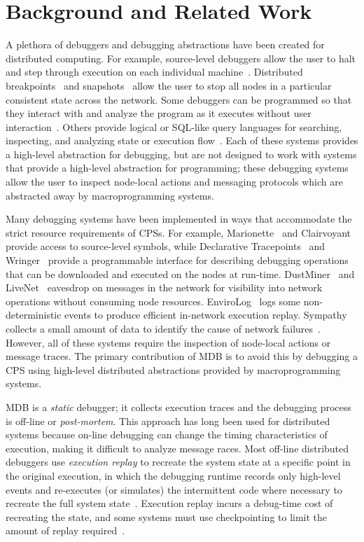 \section{Background and Related Work} \label{related}

A plethora of debuggers and debugging abstractions have been created for
distributed computing.  For example, source-level debuggers allow the user to
halt and step through execution on each individual
machine~\cite{Linton1990,Center1997,Browne2001}.  Distributed
breakpoints~\cite{Miller1988,Fowler1990,Garg1994} and
snapshots~\cite{Chandy1985} allow the user to stop all nodes in a particular
consistent state across the network.  Some debuggers can be programmed so that
they interact with and analyze the program as it executes without user
interaction~\cite{Golan1993,Maybee1992,Winterbottom1994}. Others provide logical
or SQL-like query languages for searching, inspecting, and analyzing state or
execution flow~\cite{Ducass'e1999,Powell1983,Lencevicius2003}.  Each of these
systems provides a high-level abstraction for debugging, but are not designed to
work with systems that provide a high-level abstraction for programming; these
debugging systems allow the user to inspect node-local actions and messaging
protocols which are abstracted away by macroprogramming systems.

Many debugging systems have been implemented in ways that accommodate the strict
resource requirements of CPSs.  For example, Marionette~\cite{Whitehouseb} and
Clairvoyant~\cite{Yang2007} provide access to source-level symbols, while
Declarative Tracepoints~\cite{Cao2008} and Wringer~\cite{Tavakoli2008} provide a
programmable interface for describing debugging operations that can be
downloaded and executed on the nodes at run-time.  DustMiner~\cite{Khan2008} and
LiveNet~\cite{Chen2008} eavesdrop on messages in the network for visibility into
network operations without consuming node resources.  EnviroLog~\cite{Luo2006}
logs some non-deterministic events to produce efficient in-network execution
replay.  Sympathy collects a small amount of data to identify the cause of
network failures~\cite{Ramanathan2005}.  However, all of these systems require
the inspection of node-local actions or message traces.  The primary
contribution of MDB is to avoid this by debugging a CPS using high-level
distributed abstractions provided by macroprogramming systems.

MDB is a \emph{static} debugger; it collects execution traces and the debugging
process is off-line or \emph{post-mortem}.  This approach has long been used for
distributed systems because on-line debugging can change the timing
characteristics of execution, making it difficult to analyze message races.
Most off-line distributed debuggers use \emph{execution replay} to recreate the
system state at a specific point in the original execution, in which the
debugging runtime records only high-level events and re-executes (or simulates)
the intermittent code where necessary to recreate the full system
state~\cite{Wittie1986,LeBlanc1987}. Execution replay incurs a debug-time cost
of recreating the state, and some systems must use checkpointing to limit the
amount of replay required~\cite{Wittie1986}.


